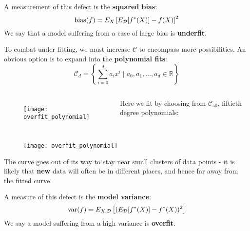 %
\begin{frame}
  A measurement of this defect is the \textbf{squared bias}:
  $$ \operatorname*{bias}(f) = E_X \left[ E_{\mathcal{D}}[f^*(X)] - f(X) \right] ^2$$
  We say that a model suffering from a case of large bias is \textbf{underfit}.
\end{frame}
%
\begin{frame}
  To combat under fitting, we must increase $\mathcal{C}$ to encompass more possibilities. An obvious option is to expand into the \textbf{polynomial fits}:
  $$\mathcal{C}_d = \left\{ \sum_{i=0}^{d} a_i x^i \mid a_0, a_1, \ldots, a_d \in \mathbb{R} \right\}$$
\end{frame}
%
\begin{frame}
  \begin{columns}
      \begin{figure}
        \texttt{[image: overfit\_polynomial]}
      \end{figure}
  Here we fit by choosing from $\mathcal{C}_{50}$, fiftieth degree polynomials:
  \end{columns}
\end{frame}
%
\begin{frame}
  \begin{figure}
    \texttt{[image: overfit\_polynomial]}
  \end{figure}
  The curve goes out of its way to stay near small clusters of data points - it is likely that \textbf{new} data will often be in different places, and hence far away from the fitted curve.
\end{frame}
%
\begin{frame}
  A measure of this defect is the \textbf{model variance}:
  $$ \operatorname*{var}(f) = E_{X, \mathcal{D}} \left[ (E_{\mathcal{D}}[f^*(X)] - f^*(X))^2 \right] $$
  We say a model suffering from a high variance is \textbf{overfit}.
\end{frame}
